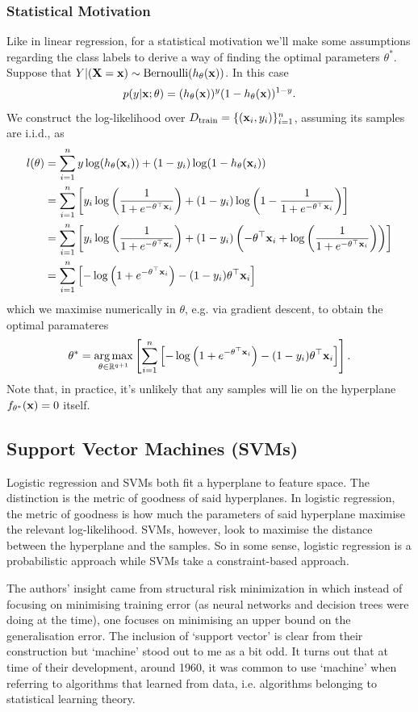 \documentclass[11pt]{article}
\begin{document}
\subsubsection{Statistical Motivation}
Like in linear regression, for a statistical motivation we'll make some assumptions regarding the class labels to derive a way of finding the optimal parameters $\theta^{*}$. Suppose that $Y|(\mathbf{X}=\mathbf{x})\sim\text{Bernoulli}(h_{\theta}(\mathbf{x}))$. In this case
$$
p(y|\mathbf{x};\theta)=(h_{\theta}(\mathbf{x}))^{y}(1-h_{\theta}(\mathbf{x}))^{1-y}.
$$
We construct the log-likelihood over $D_{\text{train}}=\{(\mathbf{x}_i,y_i)\}_{i=1}^n$, assuming its samples are i.i.d., as
\begin{align*}
    l(\theta)
    &=
    \sum_{i=1}^ny\log(h_{\theta}(\mathbf{x}_i))+(1-y_i)\log(1-h_{\theta}(\mathbf{x}_i))\\
    &=
    \sum_{i=1}^n\left[y_i\log\left(\frac{1}{1+e^{-\theta^{\top}\mathbf{x}_i}}\right)+(1-y_i)\log\left(1-\frac{1}{1+e^{-\theta^{\top}\mathbf{x}_i}}\right)\right]\\
    &=
    \sum_{i=1}^n\left[y_i\log\left(\frac{1}{1+e^{-\theta^{\top}\mathbf{x}_i}}\right)+(1-y_i)\left(-\theta^{\top}\mathbf{x}_i+\log\left(\frac{1}{1+e^{-\theta^{\top}\mathbf{x}_i}}\right)\right)\right]\\
    &=
    \sum_{i=1}^n\left[-\log\left(1+e^{-\theta^{\top}\mathbf{x}_i}\right)-(1-y_i)\theta^{\top}\mathbf{x}_i\right]
\end{align*}
which we maximise numerically in $\theta$, e.g. via gradient descent, to obtain the optimal paramateres
$$
\theta^{*}
=
\operatorname*{arg\,max}_{\theta\in\mathbb{R}^{q+1}}\left[\sum_{i=1}^n\left[-\log\left(1+e^{-\theta^{\top}\mathbf{x}_i}\right)-(1-y_i)\theta^{\top}\mathbf{x}_i\right]\right].
$$
Note that, in practice, it's unlikely that any samples will lie on the hyperplane $f_{\theta^*}(\mathbf{x})=0$ itself.

\subsection{\REV{: }Support Vector Machines (SVMs)}
Logistic regression and SVMs both fit a hyperplane to feature space. The distinction is the metric of goodness of said hyperplanes. In logistic regression, the metric of goodness is how much the parameters of said hyperplane maximise the relevant log-likelihood. SVMs, however, look to maximise the distance between the hyperplane and the samples. So in some sense, logistic regression is a probabilistic approach while SVMs take a constraint-based approach.

The authors' insight came from structural risk minimization in which instead of focusing on minimising training error (as neural networks and decision trees were doing at the time), one focuses on minimising an upper bound on the generalisation error. The inclusion of `support vector' is clear from their construction but `machine' stood out to me as a bit odd. It turns out that at time of their development, around 1960, it was common to use `machine' when referring to algorithms that learned from data, i.e. algorithms belonging to statistical learning theory.
\end{document}
